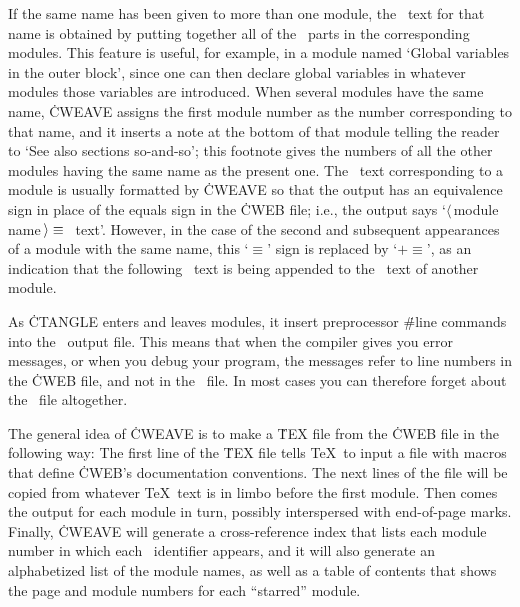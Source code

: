 If the same name has been given to more than one module, the \Cee\ text
for that name is obtained by putting together all of the \Cee\ parts in
the corresponding modules. This feature is useful, for example, in a
module named `Global variables in the outer block', since one can then
declare global variables in whatever modules those variables are
introduced. When several modules have the same name, \.{CWEAVE} assigns the
first module number as the number corresponding to that name, and it
inserts a note at the bottom of that module telling the reader to `See
also sections so-and-so'; this footnote gives the numbers of all the other
modules having the same name as the present one. The \Cee\ text
corresponding to a module is usually formatted by \.{CWEAVE} so that the
output has an equivalence sign in place of the equals sign in the \.{CWEB}
file; i.e., the output says `$\langle\,$module
name$\,\rangle\equiv\null$\Cee\ text'. However, in the case of the second
and subsequent appearances of a module with the same name, this `$\equiv$'
sign is replaced by `$\mathrel+\equiv$', as an indication that the 
following \Cee\ text is being appended to the \Cee\ text of another module.

As \.{CTANGLE} enters and leaves modules, it insert preprocessor
\.{\#line} commands into the \Cee\ output file.  This means that
when the compiler gives you error messages, or when you debug your program,
the messages refer to line numbers in the \.{CWEB} file, and not in the
\Cee\ file.  In most cases you can therefore
forget about the \Cee\ file altogether.

The general idea of \.{CWEAVE} is to make a \.{TEX} file from the \.{CWEB}
file in the following way: The first line of the \.{TEX} file
tells \TeX\ to input a file with macros that
define \.{CWEB}'s documentation conventions. The next lines of the file
will be copied from whatever \TeX\ text is in limbo before the first
module.  Then comes the output for each module in turn, possibly
interspersed with end-of-page marks.  Finally, \.{CWEAVE} will generate a
cross-reference index that lists each module number in which each \Cee\
identifier appears, and it will also generate an alphabetized list
of the module names, as well as a table of contents that
shows the page and module numbers for each ``starred'' module.

